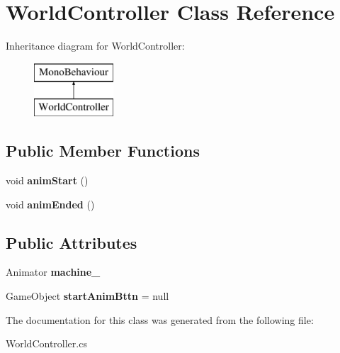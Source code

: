 \hypertarget{class_world_controller}{}\section{World\+Controller Class Reference}
\label{class_world_controller}
Inheritance diagram for World\+Controller\+:\begin{figure}[H]
\begin{center}
\leavevmode
\includegraphics[height=2.000000cm]{class_world_controller}
\end{center}
\end{figure}
\subsection*{Public Member Functions}
\begin{DoxyCompactItemize}
\item 
\mbox{\label{class_world_controller_a16dd47d6cb47d7e9f4fbd1b70e597afd}} 
void {\bfseries anim\+Start} ()
\item 
\mbox{\label{class_world_controller_ab03bc22973aba3a5fda4000f5ba7159e}} 
void {\bfseries anim\+Ended} ()
\end{DoxyCompactItemize}
\subsection*{Public Attributes}
\begin{DoxyCompactItemize}
\item 
\mbox{\label{class_world_controller_a94e5f3a146e639dc2d6156470313f7b9}} 
Animator {\bfseries machine\+\_}
\item 
\mbox{\label{class_world_controller_a093c7db83872c7d8b09a1c67937ae121}} 
Game\+Object {\bfseries start\+Anim\+Bttn} = null
\end{DoxyCompactItemize}


The documentation for this class was generated from the following file\+:\begin{DoxyCompactItemize}
\item 
World\+Controller.\+cs\end{DoxyCompactItemize}
